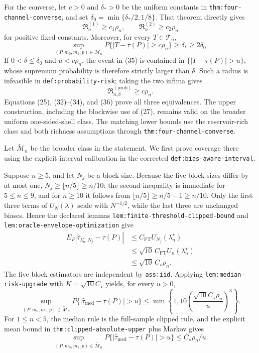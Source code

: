 For the converse, let \(c>0\) and \(\delta_*>0\) be the uniform constants in
\texttt{thm:four-channel-converse}, and set
\(\delta_0=\min\{\delta_*/2,1/8\}\).  That theorem directly gives
\[
\mathfrak R_n^{(1)}\geq c_1\rho_n,
\qquad
\mathfrak R_n^{(2)}\geq c_2\rho_n                                 \tag{34}
\]
for positive fixed constants.  Moreover, for every \(T\in\mathcal T_n\),
\[
\sup_{(P,m_0,m_1,p)\in\mathcal M_n}
P\{|T-\tau(P)|\geq c\rho_n\}
\geq\delta_*\geq2\delta_0.                                       \tag{35}
\]
If \(0<\delta\leq\delta_0\) and \(u<c\rho_n\), the event in (35) is
contained in \(\{|T-\tau(P)|>u\}\), whose supremum probability is therefore
strictly larger than \(\delta\).  Such a radius is infeasible in
\texttt{def:probability-risk}; taking the two infima gives
\[
\mathfrak R_{n,\delta}^{(\mathrm{prob})}\geq c\rho_n.               \tag{36}
\]
Equations (25), (32)--(34), and (36) prove all three equivalences.  The upper
construction, including the blockwise use of (27), remains valid on the
broader uniform one-sided-shell class.  The matching lower bounds use the
reservoir-rich class and both richness assumptions through
\texttt{thm:four-channel-converse}.

Let \(\widetilde{\mathcal M}_n\) be the broader class in the statement.  We
first prove coverage there using the explicit interval calibration in the
corrected \texttt{def:bias-aware-interval}.

Suppose \(n\geq5\), and let \(N_j\) be a block size.  Because the five block sizes differ by at most one, \(N_j\geq\lfloor n/5\rfloor\geq n/10\): the second inequality is immediate for \(5\leq n\leq9\), and for \(n\geq10\) it follows from \(\lfloor n/5\rfloor\geq n/5-1\geq n/10\).  Only the first three terms of \(U_N(\lambda)\) scale with \(N^{-1/2}\), while the last three are unchanged biases.  Hence the declared lemmas \texttt{lem:finite-threshold-clipped-bound} and \texttt{lem:oracle-envelope-optimization} give \[\begin{split}
E_P|\widehat\tau_{\lambda_n^\star,N_j}-\tau(P)|
&\leq C_{\mathrm{FT}}U_{N_j}(\lambda_n^\star)\\
&\leq\sqrt{10}\,C_{\mathrm{FT}}U_n(\lambda_n^\star)\\
&\leq\sqrt{10}\,C_\star\rho_n.
\end{split} \tag{37}
\]
The five block estimators are independent by \texttt{ass:iid}.  Applying
\texttt{lem:median-risk-upgrade} with
\(K=\sqrt{10}C_\star\) yields, for every \(u>0\),
\[
\sup_{(P,m_0,m_1,p)\in\widetilde{\mathcal M}_n}
P\{|\widehat\tau_{\mathrm{med}}-\tau(P)|>u\}
\leq\min\!\left\{1,10\left(\frac{\sqrt{10}C_\star\rho_n}{u}\right)^3\right\}.
                                                                        \tag{38}
\]
For \(1\leq n<5\), the median rule is the full-sample clipped rule, and the explicit mean bound in \texttt{thm:clipped-absolute-upper} plus Markov gives
\[
\sup_{(P,m_0,m_1,p)\in\widetilde{\mathcal M}_n}
P\{|\widehat\tau_{\mathrm{med}}-\tau(P)|>u\}
\leq C_\star\rho_n/u.                                             \tag{39}
\]

